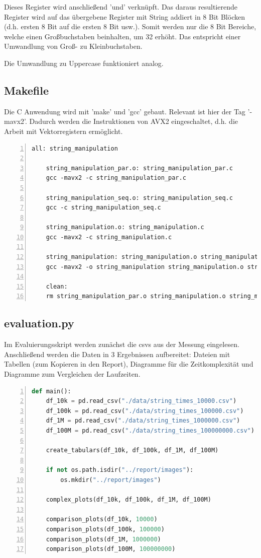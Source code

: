 \documentclass[plainarticle,zihtitle,german,final,hyperref,utf8]{zihpub}
\begin{document}
Dieses Register wird anschließend 'und' verknüpft. Das daraus resultierende Register wird auf das übergebene Register mit String addiert in 8 Bit Blöcken (d.h. ersten 8 Bit auf die ersten 8 Bit usw.). Somit werden nur die 8 Bit Bereiche, welche einen Großbuchstaben beinhalten, um 32 erhöht. Das entspricht einer Umwandlung von Groß- zu Kleinbuchstaben.

Die Umwandlung zu Uppercase funktioniert analog.


\subsection{Makefile}
Die C Anwendung wird mit 'make' und 'gcc' gebaut. Relevant ist hier der Tag '-mavx2'. Dadurch werden die Instruktionen von AVX2 eingeschaltet, d.h. die Arbeit mit Vektorregistern ermöglicht.
\begin{lstlisting}[numbers=left]
	all: string_manipulation
	
	string_manipulation_par.o: string_manipulation_par.c
	gcc -mavx2 -c string_manipulation_par.c
	
	string_manipulation_seq.o: string_manipulation_seq.c
	gcc -c string_manipulation_seq.c
	
	string_manipulation.o: string_manipulation.c
	gcc -mavx2 -c string_manipulation.c
	
	string_manipulation: string_manipulation.o string_manipulation_par.o string_manipulation_seq.o
	gcc -mavx2 -o string_manipulation string_manipulation.o string_manipulation_seq.o string_manipulation_par.o
	
	clean:
	rm string_manipulation_par.o string_manipulation.o string_manipulation_seq.o string_manipulation
\end{lstlisting}

\subsection{evaluation.py}\label{subsec:eval}
Im Evaluierungsskript werden zunächst die csvs aus der Messung eingelesen.
Anschließend werden die Daten in 3 Ergebnissen aufbereitet: Dateien mit Tabellen (zum Kopieren in den Report), Diagramme für die Zeitkomplexität und Diagramme zum Vergleichen der Laufzeiten.

\begin{lstlisting}[language=python, numbers=left]
def main():
	df_10k = pd.read_csv("./data/string_times_10000.csv")
	df_100k = pd.read_csv("./data/string_times_100000.csv")
	df_1M = pd.read_csv("./data/string_times_1000000.csv")
	df_100M = pd.read_csv("./data/string_times_100000000.csv")

	create_tabulars(df_10k, df_100k, df_1M, df_100M)

	if not os.path.isdir("../report/images"):
		os.mkdir("../report/images")

	complex_plots(df_10k, df_100k, df_1M, df_100M)

	comparison_plots(df_10k, 10000)
	comparison_plots(df_100k, 100000)
	comparison_plots(df_1M, 1000000)
	comparison_plots(df_100M, 100000000)
\end{lstlisting}
\end{document}
